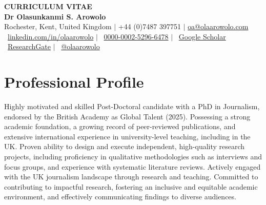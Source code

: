 \documentclass[a4paper,11pt]{article}
\begin{document}
\begin{center}
    \textbf{\Huge \scshape CURRICULUM VITAE} \\
    \vspace{5pt}
    \textbf{\Large Dr Olasunkanmi S. Arowolo} \\ \vspace{1pt}
    \small Rochester, Kent, United Kingdom $|$ +44 (0)7487 397751 $|$ \href{mailto:oa@olaarowolo.com}{{oa@olaarowolo.com}} \\
    \vspace{3pt}
    \small \faLinkedin\ \href{https://www.linkedin.com/in/olaarowolo/}{linkedin.com/in/olaarowolo} $|$ 
    \faOrcid\ \href{https://orcid.org/0000-0002-5296-6478}{0000-0002-5296-6478} $|$ 
    \faGoogleScholar\ \href{https://scholar.google.com/citations?user=3N_RQWoAAAAJ&hl=en}{Google Scholar} \\
    \vspace{2pt}
    \small \faResearchgate\ \href{https://www.researchgate.net/profile/Sunday-Arowolo}{ResearchGate} $|$ 
    \faTwitter\ \href{https://twitter.com/olaarowolo}{@olaarowolo}
\end{center}

\raggedright


\section{Professional Profile}
\small{Highly motivated and skilled Post-Doctoral candidate with a PhD in Journalism, endorsed by the British Academy as Global Talent (2025). Possessing a strong academic foundation, a growing record of peer-reviewed publications, and extensive international experience in university-level teaching, including in the UK. Proven ability to design and execute independent, high-quality research projects, including proficiency in qualitative methodologies such as interviews and focus groups, and experience with systematic literature reviews. Actively engaged with the UK journalism landscape through research and teaching. Committed to contributing to impactful research, fostering an inclusive and equitable academic environment, and effectively communicating findings to diverse audiences.}

\end{document}
